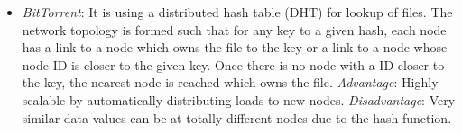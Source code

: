 \documentclass{article}
\begin{document}
\begin{enumerate}[1]
\begin{itemize}
            \item \textit{BitTorrent}: It is using a distributed hash table (DHT) for lookup of files. The network topology is formed such that for any key to a given hash, 
                  each node has a link to a node which owns the file to the key or a link to a node whose node ID is closer to the given key. Once there is no node with 
                  a ID closer to the key, the nearest node is reached which owns the file.
                  \textit{Advantage}: Highly scalable by automatically distributing loads to new nodes.
                  \textit{Disadvantage}: Very similar data values can be at totally different nodes due to the hash function.
          \end{itemize}
  \end{enumerate}
\end{document}
